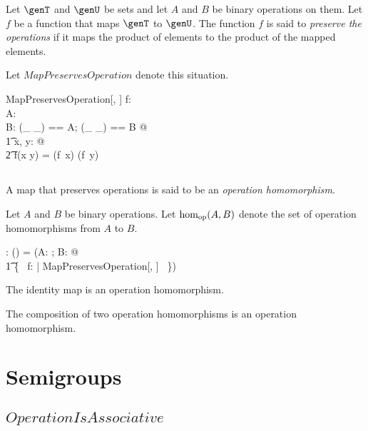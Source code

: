 \documentclass{amsart}
\begin{document}
Let $\genT$ and $\genU$ be sets and let $A$ and $B$ be binary operations on them.
Let $f$ be a function that maps $\genT$ to $\genU$.
The function $f$ is said to {\em preserve the operations} if it maps the product of elements to 
the product of the mapped elements.

Let $MapPreservesOperation$ denote this situation.

\begin{schema}{MapPreservesOperation}[\genT, \genU]
f: \genT \fun \genU \\
A: \binop \genT \\
B: \binop \genU
\where
\LET (\_ \mulG \_) == A; (\_ \timesG \_) == B @ \\
\t1	\forall x, y: \genT @ \\
\t2		f(x \mulG y) = (f~x) \timesG (f~y)
\end{schema}

\subsection{}

A map that preserves operations is said to be an {\em operation homomorphism}.

Let $A$ and $B$ be binary operations. 
Let $\operatorname{hom_{op}}(A,B)$ denote the set of operation homomorphisms from $A$ to $B$.

\begin{gendef}[\genT, \genU]
\homBinOp: \binop \genT \cross \binop \genU  \fun \power (\genT \fun \genU)
\where
\homBinOp = (\lambda A: \binop \genT; B: \binop \genU @ \\
\t1	\{~ f: \genT \fun \genU | MapPreservesOperation[\genT, \genU] ~\})
\end{gendef}

\begin{remark}
The identity map is an operation homomorphism.
\end{remark}

\begin{remark}
The composition of two operation homomorphisms is an operation homomorphism.
\end{remark}

\section{Semigroups}

\subsection{$OperationIsAssociative$}
\end{document}
